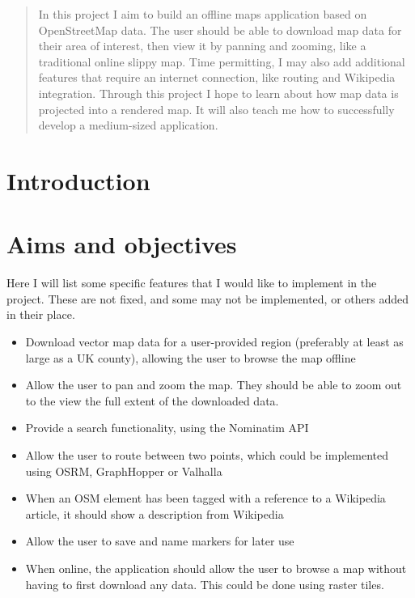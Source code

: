 \documentclass[]{final_report}
\begin{document}
\maketitle


\tableofcontents{}\newpage


\begin{abstract}

In this project I aim to build an offline maps application based on OpenStreetMap data. The user should be able to download map data for their area of interest, then view it by panning and zooming, like a traditional online slippy map. Time permitting, I may also add additional features that require an internet connection, like routing and Wikipedia integration. Through this project I hope to learn about how map data is projected into a rendered map. It will also teach me how to successfully develop a medium-sized application.

\end{abstract}

\chapter{Introduction}



\chapter{Aims and objectives}

Here I will list some specific features that I would like to implement in the project. These are not fixed, and some may not be implemented, or others added in their place.

\begin{itemize}
    \item Download vector map data for a user-provided region (preferably at least as large as a UK county), allowing the user to browse the map offline
    \item Allow the user to pan and zoom the map. They should be able to zoom out to the view the full extent of the downloaded data.
    \item Provide a search functionality, using the Nominatim API
    \item Allow the user to route between two points, which could be implemented using OSRM, GraphHopper or Valhalla
    \item When an OSM element has been tagged with a reference to a Wikipedia article, it should show a description from Wikipedia
    \item Allow the user to save and name markers for later use
    \item When online, the application should allow the user to browse a map without having to first download any data. This could be done using raster tiles.
\end{itemize}
\end{document}
